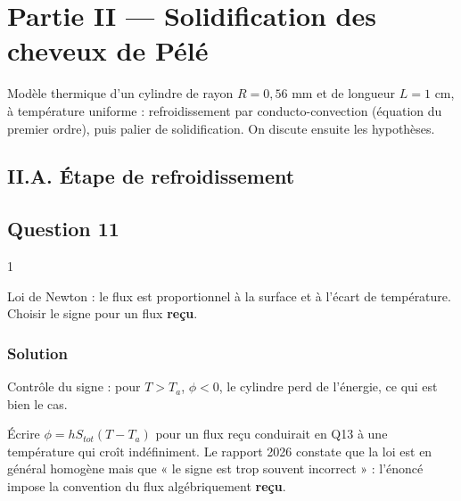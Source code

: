 \documentclass[11pt,a4paper]{article}
\newcommand{\equationajustee}[1]{%
  \sbox{\boiteequation}{$\displaystyle #1$}%
  \ifdim\wd\boiteequation>\linewidth
    \[\resizebox{\linewidth}{!}{\usebox{\boiteequation}}\]%
  \else
    \[#1\]%
  \fi}
\begin{document}
\hypertarget{partie-ii-solidification-des-cheveux-de-puxe9luxe9}{%
\section{Partie II --- Solidification des cheveux de Pélé}\label{partie-ii-solidification-des-cheveux-de-puxe9luxe9}}

Modèle thermique d'un cylindre de rayon \(R = 0{,}56\) mm et de longueur \(L = 1\) cm, à température uniforme : refroidissement par conducto-convection (équation du premier ordre), puis palier de solidification. On discute ensuite les hypothèses.

\hypertarget{ii.a.-uxe9tape-de-refroidissement}{%
\subsection{II.A. Étape de refroidissement}\label{ii.a.-uxe9tape-de-refroidissement}}

\hypertarget{question-11}{%
\subsection{Question 11}\label{question-11}}

\begin{indication}{1}

Loi de Newton : le flux est proportionnel à la surface et à l'écart de température. Choisir le signe pour un flux \textbf{reçu}.

\end{indication}

\hypertarget{solution-10}{%
\subsubsection{Solution}\label{solution-10}}

\equationajustee{\boxed{\phi = h\,S_{tot}\,(T_a - T)}}

Contrôle du signe : pour \(T > T_a\), \(\phi < 0\), le cylindre perd de l'énergie, ce qui est bien le cas.

\begin{piege}

Écrire \(\phi = hS_{tot}(T - T_a)\) pour un flux reçu conduirait en Q13 à une température qui croît indéfiniment. Le rapport 2026 constate que la loi est en général homogène mais que « le signe est trop souvent incorrect » : l'énoncé impose la convention du flux algébriquement \textbf{reçu}.

\end{piege}
\end{document}
